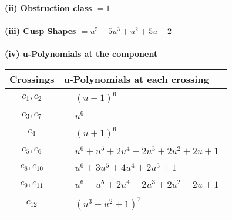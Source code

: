 \documentclass[1p]{elsarticle_modified}
\theoremstyle{definition}
\begin{document}
\flushleft \textbf{(ii) Obstruction class $= 1$}\\~\\
\flushleft \textbf{(iii) Cusp Shapes $= u^5+5 u^3+u^2+5 u-2$}\\~\\
\newpage\renewcommand{\arraystretch}{1}
\flushleft \textbf{(iv) u-Polynomials at the component}\newline \\
\begin{tabular}{m{50pt}|m{274pt}}
Crossings & \hspace{64pt}u-Polynomials at each crossing \\
\hline $$\begin{aligned}c_{1},c_{2}\end{aligned}$$&$\begin{aligned}
&(u-1)^6
\end{aligned}$\\
\hline $$\begin{aligned}c_{3},c_{7}\end{aligned}$$&$\begin{aligned}
&u^6
\end{aligned}$\\
\hline $$\begin{aligned}c_{4}\end{aligned}$$&$\begin{aligned}
&(u+1)^6
\end{aligned}$\\
\hline $$\begin{aligned}c_{5},c_{6}\end{aligned}$$&$\begin{aligned}
&u^6+u^5+2 u^4+2 u^3+2 u^2+2 u+1
\end{aligned}$\\
\hline $$\begin{aligned}c_{8},c_{10}\end{aligned}$$&$\begin{aligned}
&u^6+3 u^5+4 u^4+2 u^3+1
\end{aligned}$\\
\hline $$\begin{aligned}c_{9},c_{11}\end{aligned}$$&$\begin{aligned}
&u^6- u^5+2 u^4-2 u^3+2 u^2-2 u+1
\end{aligned}$\\
\hline $$\begin{aligned}c_{12}\end{aligned}$$&$\begin{aligned}
&(u^3- u^2+1)^2
\end{aligned}$\\
\hline
\end{tabular}\\~\\
\end{document}
